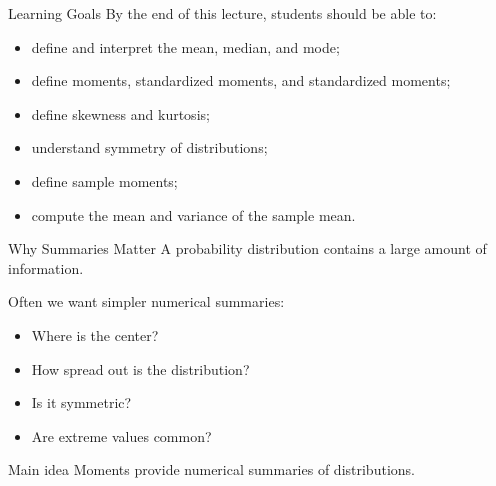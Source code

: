 \setcounter{framenumber}{0}

\begin{frame}
  \titlepage
\end{frame}

\begin{frame}{Learning Goals}
By the end of this lecture, students should be able to:
\begin{itemize}
    \item define and interpret the mean, median, and mode;
    \item define moments, standardized moments, and standardized moments;
    \item define skewness and kurtosis;
    \item understand symmetry of distributions;
    \item define sample moments;
    \item compute the mean and variance of the sample mean.
\end{itemize}
\end{frame}


\begin{frame}{Why Summaries Matter}
A probability distribution contains a large amount of information.

\vspace{0.25cm}

Often we want simpler numerical summaries:
\begin{itemize}
    \item Where is the center?
    \item How spread out is the distribution?
    \item Is it symmetric?
    \item Are extreme values  common?
\end{itemize}

\vspace{0.25cm}

\begin{keybox}{Main idea}
Moments provide numerical summaries of distributions.
\end{keybox}
\end{frame}

